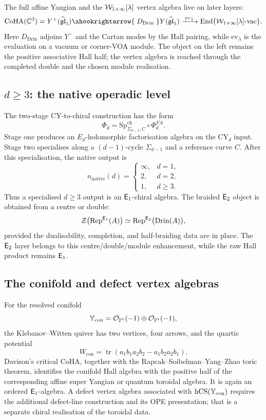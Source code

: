 The full affine Yangian and the \(\mathcal{W}_{1+\infty}[\lambda]\) vertex algebra live
on later layers:
\[
\CoHA(\C^3)
 =
Y^+(\widehat{\mathfrak{gl}}_1)
\xhookrightarrow{\;D_{\mathrm{Drin}}\;}
Y(\widehat{\mathfrak{gl}}_1)
\xrightarrow{\;\mathrm{ev}_{\lambda}\;}
\End\bigl(\Wilpha[\lambda]\text{-}\mathrm{vac}\bigr).
\]
Here \(D_{\mathrm{Drin}}\) adjoins \(Y^-\) and the Cartan modes by the
Hall pairing, while \(\mathrm{ev}_\lambda\) is the evaluation on a vacuum
or corner-VOA module.  The object on the left remains the positive
associative Hall half; the vertex algebra is reached through the
completed double and the chosen module realisation.

\subsection{\texorpdfstring{\(d\geq 3\)}{d>=3}: the native operadic level}
\label{wn:subsec:dgeq3-e1}

The two-stage CY-to-chiral construction has the form
\[
 \Phi_d=\mathrm{Sp}^{\mathrm{ch}}_{\Sigma_{d-1},C}\circ\Phi^{FA}_d.
\]
Stage one produces an \(E_d\)-holomorphic factorisation algebra on the
CY$_d$ input.  Stage two specialises along a \((d-1)\)-cycle
\(\Sigma_{d-1}\) and a reference curve \(C\).  After this specialisation,
the native output is
\[
 n_{\mathrm{native}}(d)=
 \begin{cases}
 \infty, & d=1,\\
 2, & d=2,\\
 1, & d\geq 3.
 \end{cases}
\]
Thus a specialised \(d\geq 3\) output is an \(\mathsf{E}_1\)-chiral algebra.
The braided \(\mathsf{E}_2\) object is obtained from a centre or double:
\[
 \mathcal{Z}\bigl(\mathrm{Rep}^{\mathsf{E}_1}(A)\bigr)
 \simeq
 \mathrm{Rep}^{\mathsf{E}_2}\bigl(\mathrm{Drin}(A)\bigr),
\]
provided the dualisability, completion, and half-braiding data are in
place.  The \(\mathsf{E}_2\) layer belongs to this centre/double/module
enhancement, while the raw Hall product remains \(\mathsf{E}_1\).

\subsection{The conifold and defect vertex algebras}
\label{wn:subsec:conifold-positive-half}

For the resolved conifold
\[
 \mathbb{Y}_{\mathrm{con}}
 =
 \mathcal{O}_{\mathbb{P}^1}(-1)\oplus\mathcal{O}_{\mathbb{P}^1}(-1),
\]
the Klebanov--Witten quiver has two vertices, four arrows, and the
quartic potential
\[
 W_{\mathrm{con}}
 =
 \operatorname{tr}(a_1b_1a_2b_2-a_1b_2a_2b_1).
\]
Davison's critical CoHA, together with the
Rapcak--Soibelman--Yang--Zhao toric theorem, identifies the conifold
Hall algebra with the positive half of the corresponding affine super
Yangian or quantum toroidal algebra.  It is again an ordered
\(\mathsf{E}_1\)-algebra.  A defect vertex algebra associated with
\(\mathrm{hCS}(\mathbb{Y}_{\mathrm{con}})\) requires the additional defect-line
construction and its OPE presentation; that is a separate chiral
realisation of the toroidal data.

